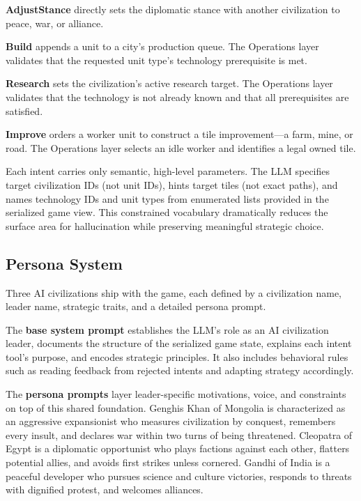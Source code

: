 \documentclass[conference]{IEEEtran}
\begin{document}
\textbf{AdjustStance} directly sets the diplomatic stance with another
civilization to peace, war, or alliance.

\textbf{Build} appends a unit to a city's production queue. The Operations
layer validates that the requested unit type's technology prerequisite is met.

\textbf{Research} sets the civilization's active research target. The
Operations layer validates that the technology is not already known and
that all prerequisites are satisfied.

\textbf{Improve} orders a worker unit to construct a tile improvement---a
farm, mine, or road. The Operations layer selects an idle worker and
identifies a legal owned tile.

Each intent carries only semantic, high-level parameters. The LLM specifies
target civilization IDs (not unit IDs), hints target tiles (not exact
paths), and names technology IDs and unit types from enumerated lists
provided in the serialized game view. This constrained vocabulary
dramatically reduces the surface area for hallucination while preserving
meaningful strategic choice.

\subsection{Persona System}

Three AI civilizations ship with the game, each defined by a civilization
name, leader name, strategic traits, and a detailed persona prompt.

The \textbf{base system prompt} establishes the LLM's role as an AI
civilization leader, documents the structure of the serialized game state,
explains each intent tool's purpose, and encodes strategic principles. It
also includes behavioral rules such as reading feedback from rejected
intents and adapting strategy accordingly.

The \textbf{persona prompts} layer leader-specific motivations, voice, and
constraints on top of this shared foundation. Genghis Khan of Mongolia is
characterized as an aggressive expansionist who measures civilization by
conquest, remembers every insult, and declares war within two turns of
being threatened. Cleopatra of Egypt is a diplomatic opportunist who plays
factions against each other, flatters potential allies, and avoids first
strikes unless cornered. Gandhi of India is a peaceful developer who
pursues science and culture victories, responds to threats with dignified
protest, and welcomes alliances.
\end{document}

